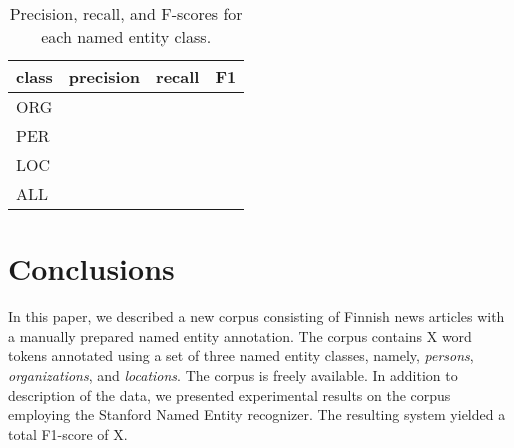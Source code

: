 \documentclass[11pt]{article}
\begin{document}
\begin{table}[t!]
\begin{center}
\begin{tabular}{l|ccc}
 class & precision & recall & F1\\
\hline
ORG &   & & \\
PER &   &  & \\
LOC &   &  & \\
\hline
ALL &  &  & \\
\end{tabular}
\end{center}
\caption{Precision, recall, and F-scores for each named entity class.}
\label{tab: precision recall and f-scores}
\end{table}




\section{Conclusions}
\label{sec: conclusions}

In this paper, we described a new corpus consisting of Finnish news articles with a manually prepared named entity annotation. The corpus contains X word tokens annotated using a set of three named entity classes, namely,  \textit{persons}, \textit{organizations}, and \textit{locations}. The corpus is freely available. In addition to description of the data, we presented experimental results on the corpus employing the Stanford Named Entity recognizer. The resulting system yielded a total F1-score of X.



\newpage

%

\end{document}

